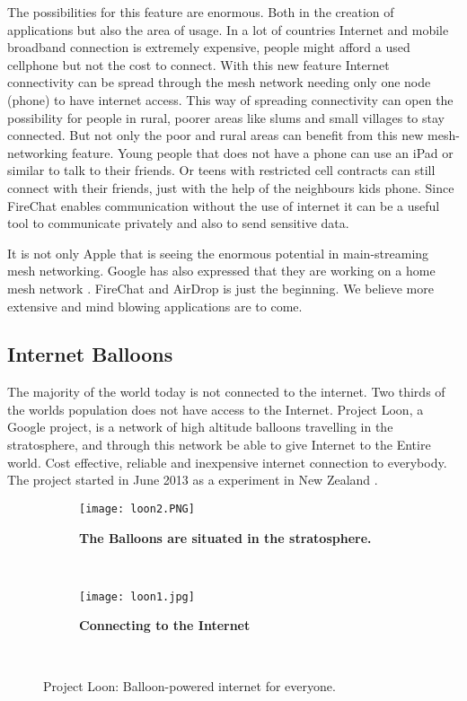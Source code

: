 The possibilities for this feature are enormous. Both in the creation of applications but also the area of usage. In a lot of countries Internet and mobile broadband connection is extremely expensive, people might afford a used cellphone but not the cost to connect. With this new feature Internet connectivity can be spread through the mesh network needing only one node (phone) to have internet access. This way of spreading connectivity can open the possibility for people in rural, poorer areas like slums and small villages to stay connected. But not only the poor and rural areas can benefit from this new mesh-networking feature. Young people that does not have a phone can use an iPad or similar to talk to their friends. Or teens with restricted cell contracts can still connect with their friends, just with the help of the neighbours kids phone. Since FireChat enables communication without the use of internet it can be a useful tool to communicate privately and also to send sensitive data.
 
It is not only Apple that is seeing the enormous potential in main-streaming mesh networking. Google has also expressed that they are working on a home mesh network \cite{googleMesh}. FireChat and AirDrop is just the beginning. We believe more extensive and mind blowing applications are to come. 


\subsection{Internet Balloons}
The majority of the world today is not connected to the internet. Two thirds of the worlds population does not have access to the Internet. Project Loon, a Google project, is a network of high altitude balloons travelling in the stratosphere, and through this network be able to give Internet to the Entire world. Cost effective, reliable and inexpensive internet connection to everybody. The project started in June 2013 as a experiment in New Zealand \cite{loon}. 

\begin{figure}
        \centering
        \begin{subfigure}[t]{0.43\textwidth}
                \texttt{[image: loon2.PNG]}
                \caption[The Balloons are situated in the stratosphere]{\textbf{The Balloons are situated in the stratosphere.}} 
                \label{fig:loonStratosphere}
        \end{subfigure}%
        ~ %
        \begin{subfigure}[t]{0.415\textwidth}
                \texttt{[image: loon1.jpg]}
               \caption[Connecting to the Internet]							{\textbf{Connecting to the Internet}} 
                \label{fig:loonConnect}
        \end{subfigure}
        ~ %
        \caption{Project Loon: Balloon-powered internet for everyone.}\label{fig:loon}
\end{figure}


